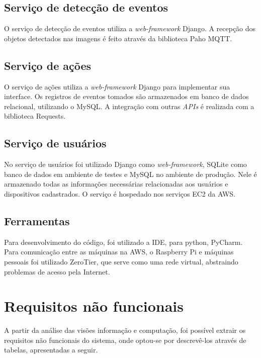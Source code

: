 \documentclass[]{politex}
\begin{document}
\subsection{Serviço de detecção de eventos}
O serviço de detecção de eventos utiliza a \textit{web-framework} Django. A recepção dos objetos detectados nas imagens é feito através da biblioteca Paho MQTT.

\subsection{Serviço de ações}
O serviço de ações utiliza a \textit{web-framework} Django para implementar sua interface. Os registros de eventos tomados são armazenados em banco de dados relacional, utilizando o MySQL. A integração com outras \textit{APIs} é realizada com a biblioteca Requests.

\subsection{Serviço de usuários}
No serviço de usuários foi utilizado Django como \textit{web-framework}, SQLite como banco de dados em ambiente de testes e MySQL no ambiente de produção. Nele é armazenado todas as informações necessárias relacionadas aos usuários e dispositivos cadastrados. O serviço é hospedado nos serviços EC2 da AWS.

\subsection{Ferramentas}
Para desenvolvimento do código, foi utilizado a IDE, para python, PyCharm. Para comunicação entre as máquinas na AWS, o Raspberry Pi e máquinas pessoais foi utilizado ZeroTier, que serve como uma rede virtual, abstraindo problemas de acesso pela Internet.

\section{Requisitos não funcionais}
A partir da análise das visões informação e computação, foi possível extrair os requisitos não funcionais do sistema, onde optou-se por descrevê-los através de tabelas, apresentadas a seguir.
\end{document}
